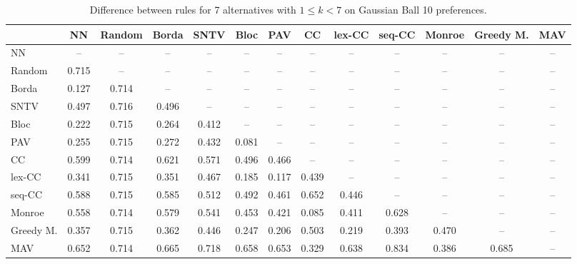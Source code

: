 
\begin{table*}[h!]
\centering
\begin{tabular}{lcccccccccccc}
\toprule
 & NN & Random & Borda & SNTV & Bloc & PAV & CC & lex-CC & seq-CC & Monroe & Greedy M. & MAV \\
\midrule
NN & -- & -- & -- & -- & -- & -- & -- & -- & -- & -- & -- & -- \\
Random & 0.715 & -- & -- & -- & -- & -- & -- & -- & -- & -- & -- & -- \\
Borda & 0.127 & 0.714 & -- & -- & -- & -- & -- & -- & -- & -- & -- & -- \\
SNTV & 0.497 & 0.716 & 0.496 & -- & -- & -- & -- & -- & -- & -- & -- & -- \\
Bloc & 0.222 & 0.715 & 0.264 & 0.412 & -- & -- & -- & -- & -- & -- & -- & -- \\
PAV & 0.255 & 0.715 & 0.272 & 0.432 & 0.081 & -- & -- & -- & -- & -- & -- & -- \\
CC & 0.599 & 0.714 & 0.621 & 0.571 & 0.496 & 0.466 & -- & -- & -- & -- & -- & -- \\
lex-CC & 0.341 & 0.715 & 0.351 & 0.467 & 0.185 & 0.117 & 0.439 & -- & -- & -- & -- & -- \\
seq-CC & 0.588 & 0.715 & 0.585 & 0.512 & 0.492 & 0.461 & 0.652 & 0.446 & -- & -- & -- & -- \\
Monroe & 0.558 & 0.714 & 0.579 & 0.541 & 0.453 & 0.421 & 0.085 & 0.411 & 0.628 & -- & -- & -- \\
Greedy M. & 0.357 & 0.715 & 0.362 & 0.446 & 0.247 & 0.206 & 0.503 & 0.219 & 0.393 & 0.470 & -- & -- \\
MAV & 0.652 & 0.714 & 0.665 & 0.718 & 0.658 & 0.653 & 0.329 & 0.638 & 0.834 & 0.386 & 0.685 & -- \\
\bottomrule
\end{tabular}

\caption{Difference between rules for 7 alternatives with $1 \leq k < 7$ on Gaussian Ball 10 preferences.}
\end{table*}
